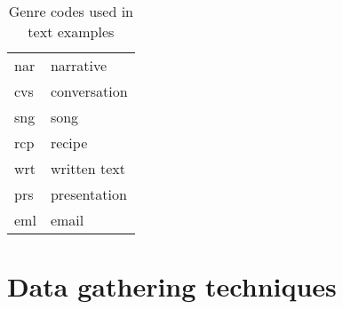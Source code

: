 \begin{table}
\begin{center}
\begin{tabular}{ll}
nar & narrative \\ 
cvs & conversation \\ 
sng & song \\ 
rcp & recipe \\ 
wrt & written text \\ 
prs & presentation \\ 
eml & email \\ 
\end{tabular}
\caption{Genre codes used in text examples}
\label{tab:genres}
\end{center}

\end{table}

\section{Data gathering techniques}
